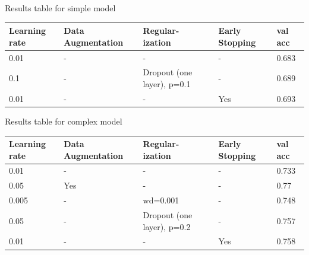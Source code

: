 \documentclass[sigconf,nonacm]{acmart}
\begin{document}
\vspace{5mm} %

Results table for simple model

\begin{tabular}{| m{1cm} | m{1cm}| m{1cm} | m{1cm}| m{1cm}|} 
\hline
Learning rate & Data Augmentation & Regular- ization & Early Stopping  & val acc\\ 
\hline
0.01 & - & - & -  & 0.683\\ 
\hline
0.1 & - & Dropout (one layer), p=0.1 & -  & 0.689\\ 
\hline
0.01 & - & - & Yes  & 0.693\\ 
\hline

\end{tabular}

\vspace{7mm} %
Results table for complex model

\begin{tabular}{|m{1cm} | m{1cm}| m{1cm} | m{1cm}| m{1cm}|} 
\hline
Learning rate & Data Augmentation & Regular- ization & Early Stopping & val acc\\ 
\hline
0.01 & - & - & -  & 0.733\\ 
\hline
0.05 & Yes & - & - & 0.77\\ 
\hline
0.005 & - & wd=0.001 & - & 0.748\\ 
\hline
0.05 & - & Dropout (one layer), p=0.2 & -  & 0.757\\ 
\hline
0.01 & - & - & Yes  & 0.758\\ 
\hline
\end{tabular}





\end{document}
